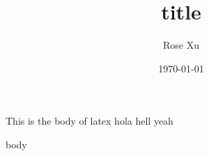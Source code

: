 \documentclass[12pt]{article}
\title{title}
\author{Rose Xu}
\date{\today}
\begin{document}
\maketitle

This is the body of latex hola hell yeah

{{body}}
\end{document}

